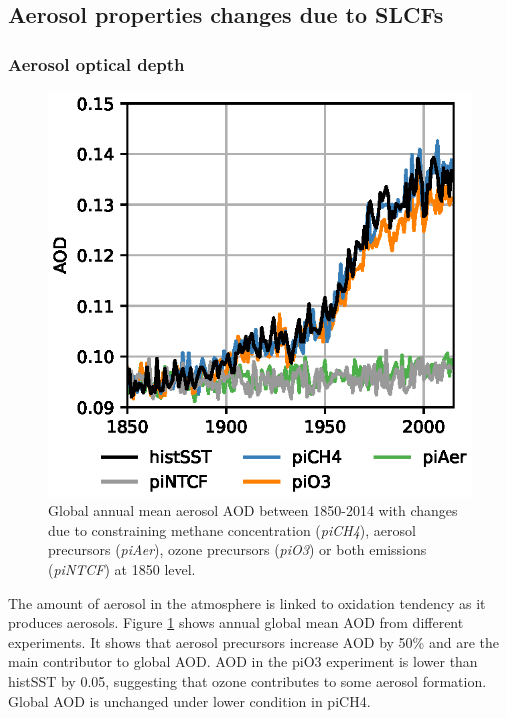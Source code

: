 \subsection{Aerosol properties changes due to SLCFs}

\subsubsection{Aerosol optical depth}

\begin{figure}
    \centering
    \includegraphics{Chapter3/Figs/f05_aod-trend.eps}
    \caption[Global annual mean aerosol AOD between 1850-2014 with changes due to SLCFs]{Global annual mean aerosol AOD between 1850-2014 with changes due to constraining methane concentration (\textit{piCH4}), aerosol precursors (\textit{piAer}), ozone precursors (\textit{piO3}) or both emissions (\textit{piNTCF}) at 1850 level.}
    \label{fig:ch3:AOD}
\end{figure}


The amount of aerosol in the atmosphere is linked to  oxidation tendency as it produces  aerosols. Figure \ref{fig:ch3:AOD} shows annual global mean AOD from different experiments. It shows that aerosol precursors increase AOD by 50\% and are the main contributor to global AOD. AOD in the piO3 experiment is lower than histSST by 0.05, suggesting that ozone contributes to some aerosol formation. Global AOD is unchanged under lower  condition in piCH4.


